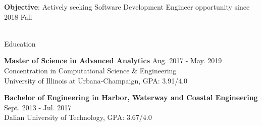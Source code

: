 \documentclass{resume} %
\begin{document}
\textbf{Objective}: Actively seeking Software Development Engineer opportunity since 2018 Fall\\
\\
\begin{rSection}{Education}



{\bf Master of Science in Advanced Analytics} \hfill {Aug. 2017 - May. 2019}
\\ 
Concentration in Computational Science \& Engineering
\\
University of Illinois at Urbana-Champaign, GPA: 3.91/4.0


{\bf Bachelor of Engineering in Harbor, Waterway and Coastal Engineering} \hfill {Sept. 2013 - Jul. 2017}
\\ 
Dalian University of Technology, GPA: 3.67/4.0



\end{rSection}
\end{document}
